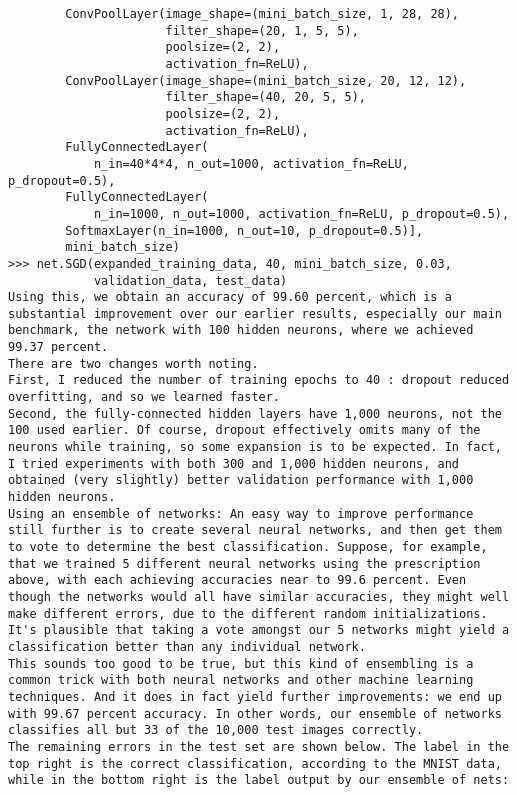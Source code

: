 \begin{lstlisting}
        ConvPoolLayer(image_shape=(mini_batch_size, 1, 28, 28), 
                      filter_shape=(20, 1, 5, 5), 
                      poolsize=(2, 2), 
                      activation_fn=ReLU),
        ConvPoolLayer(image_shape=(mini_batch_size, 20, 12, 12), 
                      filter_shape=(40, 20, 5, 5), 
                      poolsize=(2, 2), 
                      activation_fn=ReLU),
        FullyConnectedLayer(
            n_in=40*4*4, n_out=1000, activation_fn=ReLU, p_dropout=0.5),
        FullyConnectedLayer(
            n_in=1000, n_out=1000, activation_fn=ReLU, p_dropout=0.5),
        SoftmaxLayer(n_in=1000, n_out=10, p_dropout=0.5)], 
        mini_batch_size)
>>> net.SGD(expanded_training_data, 40, mini_batch_size, 0.03, 
            validation_data, test_data)
Using this, we obtain an accuracy of 99.60 percent, which is a substantial improvement over our earlier results, especially our main benchmark, the network with 100 hidden neurons, where we achieved 99.37 percent.
There are two changes worth noting. 
First, I reduced the number of training epochs to 40 : dropout reduced overfitting, and so we learned faster.
Second, the fully-connected hidden layers have 1,000 neurons, not the 100 used earlier. Of course, dropout effectively omits many of the neurons while training, so some expansion is to be expected. In fact, I tried experiments with both 300 and 1,000 hidden neurons, and obtained (very slightly) better validation performance with 1,000
hidden neurons.
Using an ensemble of networks: An easy way to improve performance still further is to create several neural networks, and then get them to vote to determine the best classification. Suppose, for example, that we trained 5 different neural networks using the prescription above, with each achieving accuracies near to 99.6 percent. Even though the networks would all have similar accuracies, they might well make different errors, due to the different random initializations. It's plausible that taking a vote amongst our 5 networks might yield a classification better than any individual network.
This sounds too good to be true, but this kind of ensembling is a common trick with both neural networks and other machine learning techniques. And it does in fact yield further improvements: we end up with 99.67 percent accuracy. In other words, our ensemble of networks classifies all but 33 of the 10,000 test images correctly. 
The remaining errors in the test set are shown below. The label in the top right is the correct classification, according to the MNIST data, while in the bottom right is the label output by our ensemble of nets:


\end{lstlisting}
